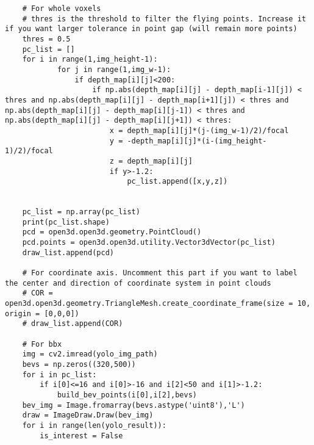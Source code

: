 \begin{verbatim}
    # For whole voxels
    # thres is the threshold to filter the flying points. Increase it if you want larger tolerance in point gap (will remain more points)
    thres = 0.5
    pc_list = []
    for i in range(1,img_height-1):
            for j in range(1,img_w-1):
                if depth_map[i][j]<200:
                    if np.abs(depth_map[i][j] - depth_map[i-1][j]) < thres and np.abs(depth_map[i][j] - depth_map[i+1][j]) < thres and np.abs(depth_map[i][j] - depth_map[i][j-1]) < thres and np.abs(depth_map[i][j] - depth_map[i][j+1]) < thres:
                        x = depth_map[i][j]*(j-(img_w-1)/2)/focal
                        y = -depth_map[i][j]*(i-(img_height-1)/2)/focal
                        z = depth_map[i][j]
                        if y>-1.2:
                            pc_list.append([x,y,z])


    pc_list = np.array(pc_list)
    print(pc_list.shape)
    pcd = open3d.open3d.geometry.PointCloud()
    pcd.points = open3d.open3d.utility.Vector3dVector(pc_list)
    draw_list.append(pcd)

    # For coordinate axis. Uncomment this part if you want to label the center and direction of coordinate system in point clouds
    # COR = open3d.open3d.geometry.TriangleMesh.create_coordinate_frame(size = 10, origin = [0,0,0])
    # draw_list.append(COR)   
    
    # For bbx
    img = cv2.imread(yolo_img_path)
    bevs = np.zeros((320,500))
    for i in pc_list:
        if i[0]<=16 and i[0]>-16 and i[2]<50 and i[1]>-1.2:
            build_bev_points(i[0],i[2],bevs)
    bev_img = Image.fromarray(bevs.astype('uint8'),'L')
    draw = ImageDraw.Draw(bev_img)   
    for i in range(len(yolo_result)):
        is_interest = False


\end{verbatim}

